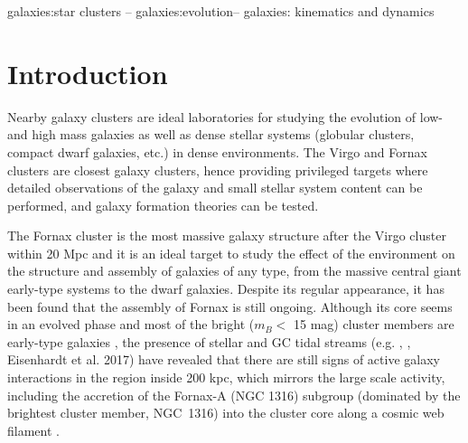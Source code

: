 \documentclass[useAMS,usenatbib]{mn2e}
\begin{document}
\begin{keywords}
galaxies:star clusters -- galaxies:evolution-- galaxies: kinematics and dynamics
\end{keywords}

\section{Introduction}

Nearby galaxy clusters are ideal laboratories for studying the evolution of 
low- and high mass galaxies as well as dense stellar systems (globular 
clusters, compact dwarf galaxies, etc.) in dense environments. The Virgo and 
Fornax clusters are closest galaxy clusters, hence providing privileged targets 
where detailed observations of the galaxy and small stellar system content can 
be performed, and galaxy formation theories can be tested. 

The Fornax cluster is the most massive galaxy structure after the Virgo cluster 
within 20 Mpc and it is an ideal target to study the effect of the environment 
on the structure and assembly of galaxies of any type, from the massive central 
giant early-type systems to the dwarf galaxies. Despite its regular appearance, 
it has been found that the assembly of Fornax is still ongoing. 
Although its core seems in an evolved phase \citep{Grillmair94,Jordan07} 
and most of the bright ($m_B < $  15 mag) cluster members are 
early-type galaxies \citep{Ferguson89}, the presence of stellar and GC tidal 
streams (e.g. \citealt{Iodice16}, \citealt{DAbrusco16}, Eisenhardt et al. 
2017) have revealed that there are still signs of active galaxy interactions in 
the region inside 200 kpc, which mirrors the large scale activity, including 
the accretion of the Fornax-A (NGC 1316) subgroup (dominated by the brightest cluster member, NGC~1316) into the cluster core along a 
cosmic web filament \citep{Drinkwater00,Scharf05}.
\end{document}
